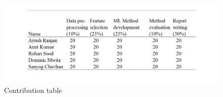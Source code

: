 \documentclass{article}
\begin{document}






\pagebreak
\begin{figure}
	\caption{Contribution table}
	\includegraphics{contributions.jpg}
\end{figure}
\end{document}
